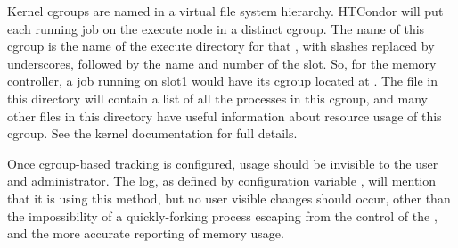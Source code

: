 Kernel cgroups are named in a virtual file system hierarchy. 
HTCondor will put each running job on the execute node in a distinct cgroup.
The name of this cgroup is the name of the execute directory for 
that , with slashes replaced by underscores, 
followed by the name and number of the slot.  
So, for the memory controller, 
a job running on slot1 would have its cgroup located at
.  
The  file in this directory will contain a list 
of all the processes in this cgroup, and
many other files in this directory have useful information about resource usage
of this cgroup.  See the kernel documentation for full details.

Once cgroup-based tracking is configured, 
usage should be invisible to the user and administrator.  
The  log, as defined by configuration variable
, 
will mention that it is using this method, 
but no user visible changes should occur,
other than the impossibility of a quickly-forking process escaping from the
control of the ,
and the more accurate reporting of memory usage.
